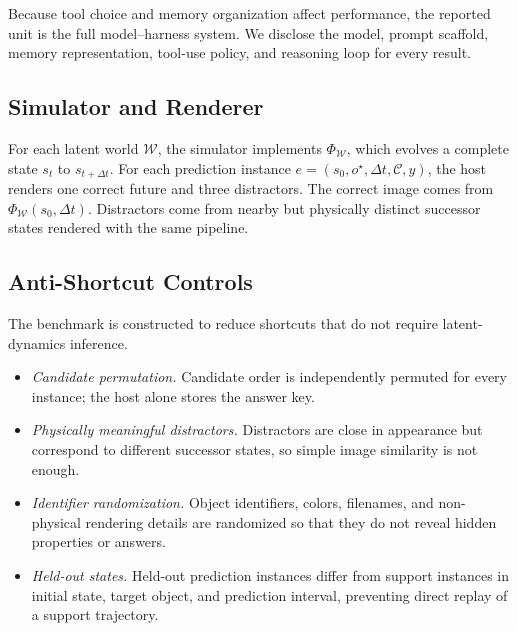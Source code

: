 
Because tool choice and memory organization affect performance, the reported unit is the full model--harness system. We disclose the model, prompt scaffold, memory representation, tool-use policy, and reasoning loop for every result.

\subsection{Simulator and Renderer}


For each latent world $\mathcal{W}$, the simulator implements $\Phi_{\mathcal{W}}$, which evolves a complete state $s_t$ to $s_{t+\Delta t}$. For each prediction instance $e=(s_0,o^\star,\Delta t,\mathcal{C},y)$, the host renders one correct future and three distractors. The correct image comes from $\Phi_{\mathcal{W}}(s_0,\Delta t)$. Distractors come from nearby but physically distinct successor states rendered with the same pipeline.

\subsection{Anti-Shortcut Controls}
\label{sec:construction:antishortcut}

The benchmark is constructed to reduce shortcuts that do not require latent-dynamics inference.
\begin{itemize}
  \item \emph{Candidate permutation.} Candidate order is independently permuted for every instance; the host alone stores the answer key.
  \item \emph{Physically meaningful distractors.} Distractors are close in appearance but correspond to different successor states, so simple image similarity is not enough.
  \item \emph{Identifier randomization.} Object identifiers, colors, filenames, and non-physical rendering details are randomized so that they do not reveal hidden properties or answers.
  \item \emph{Held-out states.} Held-out prediction instances differ from support instances in initial state, target object, and prediction interval, preventing direct replay of a support trajectory.
\end{itemize}

